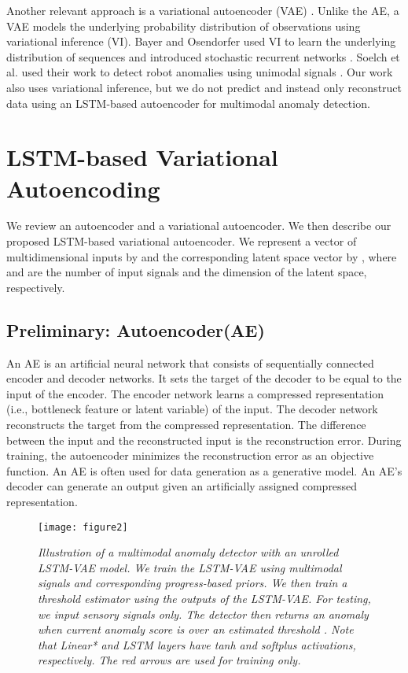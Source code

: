 \documentclass[letterpaper, 10 pt, conference]{ieeeconf}
\begin{document}
Another relevant approach is a variational autoencoder (VAE) \cite{kingma2013auto}. Unlike the AE, a VAE models the underlying probability distribution of observations using variational inference (VI). Bayer and Osendorfer used VI to learn the underlying distribution of sequences and introduced stochastic recurrent networks \cite{bayer2014learning}. Soelch et al. used their work to detect robot anomalies using unimodal signals \cite{solch2016variational}. Our work also uses variational inference, but we do not predict and instead only reconstruct data using an LSTM-based autoencoder for multimodal anomaly detection. 



\section{LSTM-based Variational Autoencoding}
We review an autoencoder and a variational autoencoder. We then describe our proposed LSTM-based variational autoencoder. We represent a vector of multidimensional inputs by  and the corresponding latent space vector by , where  and  are the number of input signals and the dimension of the latent space, respectively. 

\subsection{Preliminary: Autoencoder(AE)}
An AE is an artificial neural network that consists of sequentially connected encoder and decoder networks. It sets the target of the decoder to be equal to the input of the encoder. The encoder network learns a compressed representation (i.e., bottleneck feature or latent variable) of the input. The decoder network reconstructs the target from the compressed representation. The difference between the input and the reconstructed input is the reconstruction error. During training, the autoencoder minimizes the reconstruction error as an objective function. An AE is often used for data generation as a generative model. An AE's decoder can generate an output given an artificially assigned compressed representation.

\begin{figure*}[t]
	\centering
    \vspace{8pt}
	\texttt{[image: figure2]} 	
	\caption{\textit{Illustration of a multimodal anomaly detector with an unrolled LSTM-VAE model. We train the LSTM-VAE using multimodal signals and corresponding progress-based priors. We then train a threshold estimator using the outputs of the LSTM-VAE. For testing, we input sensory signals only. The detector then returns an anomaly when current anomaly score is over an estimated threshold . Note that Linear* and LSTM layers have tanh and softplus activations, respectively. The red arrows are used for training only.}}
	\label{fig: structure}
    \vspace{-1.0em}
\end{figure*}
\end{document}
